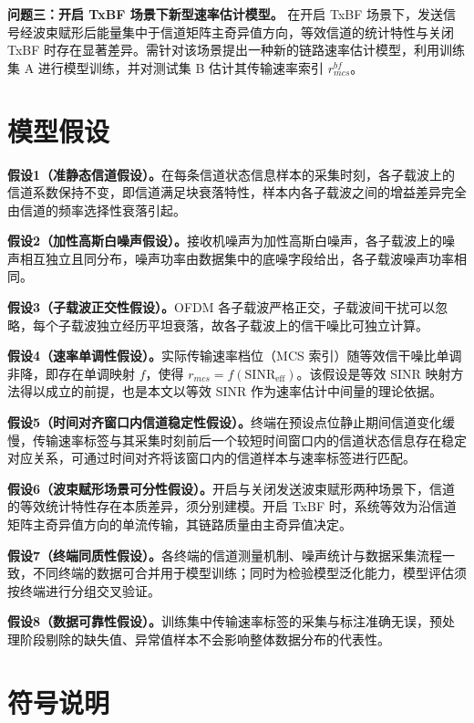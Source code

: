\documentclass[bwprint]{gmcmthesis}
\numberwithin{figure}{section}
\begin{document}
\textbf{问题三：开启 TxBF 场景下新型速率估计模型。}
在开启 TxBF 场景下，发送信号经波束赋形后能量集中于信道矩阵主奇异值方向，等效信道的统计特性与关闭 TxBF 时存在显著差异。需针对该场景提出一种新的链路速率估计模型，利用训练集 A 进行模型训练，并对测试集 B 估计其传输速率索引 $r_{mcs}^{bf}$。


\section{模型假设}

\textbf{假设1（准静态信道假设）。}在每条信道状态信息样本的采集时刻，各子载波上的信道系数保持不变，即信道满足块衰落特性，样本内各子载波之间的增益差异完全由信道的频率选择性衰落引起。

\textbf{假设2（加性高斯白噪声假设）。}接收机噪声为加性高斯白噪声，各子载波上的噪声相互独立且同分布，噪声功率由数据集中的底噪字段给出，各子载波噪声功率相同。

\textbf{假设3（子载波正交性假设）。}OFDM 各子载波严格正交，子载波间干扰可以忽略，每个子载波独立经历平坦衰落，故各子载波上的信干噪比可独立计算。

\textbf{假设4（速率单调性假设）。}实际传输速率档位（MCS 索引）随等效信干噪比单调非降，即存在单调映射 $f$，使得 $r_{mcs}=f(\mathrm{SINR}_{\mathrm{eff}})$。该假设是等效 SINR 映射方法得以成立的前提，也是本文以等效 SINR 作为速率估计中间量的理论依据。

\textbf{假设5（时间对齐窗口内信道稳定性假设）。}终端在预设点位静止期间信道变化缓慢，传输速率标签与其采集时刻前后一个较短时间窗口内的信道状态信息存在稳定对应关系，可通过时间对齐将该窗口内的信道样本与速率标签进行匹配。

\textbf{假设6（波束赋形场景可分性假设）。}开启与关闭发送波束赋形两种场景下，信道的等效统计特性存在本质差异，须分别建模。开启 TxBF 时，系统等效为沿信道矩阵主奇异值方向的单流传输，其链路质量由主奇异值决定。

\textbf{假设7（终端同质性假设）。}各终端的信道测量机制、噪声统计与数据采集流程一致，不同终端的数据可合并用于模型训练；同时为检验模型泛化能力，模型评估须按终端进行分组交叉验证。

\textbf{假设8（数据可靠性假设）。}训练集中传输速率标签的采集与标注准确无误，预处理阶段剔除的缺失值、异常值样本不会影响整体数据分布的代表性。

\section{符号说明}
\clearpage
\end{document}
